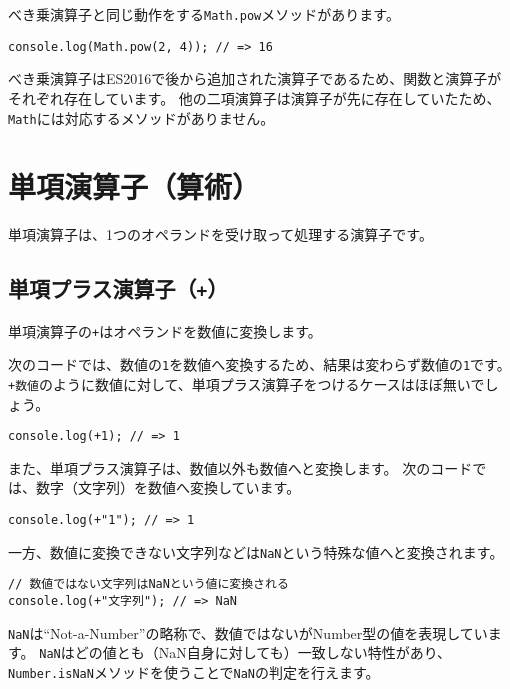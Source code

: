 べき乗演算子と同じ動作をする\texttt{Math.pow}メソッドがあります。

\begin{lstlisting}
console.log(Math.pow(2, 4)); // => 16
\end{lstlisting}

べき乗演算子はES2016で後から追加された演算子であるため、関数と演算子がそれぞれ存在しています。
他の二項演算子は演算子が先に存在していたため、\texttt{Math}には対応するメソッドがありません。

\hypertarget{unary-operator}{%
\section{単項演算子（算術）}\label{unary-operator}}

単項演算子は、1つのオペランドを受け取って処理する演算子です。

\hypertarget{unary-plus-operator}{%
\subsection{\texorpdfstring{単項プラス演算子（\texttt{+}）}{単項プラス演算子（+）}}\label{unary-plus-operator}}

単項演算子の\texttt{+}はオペランドを数値に変換します。

次のコードでは、数値の\texttt{1}を数値へ変換するため、結果は変わらず数値の\texttt{1}です。
\texttt{+数値}のように数値に対して、単項プラス演算子をつけるケースはほぼ無いでしょう。

\begin{lstlisting}
console.log(+1); // => 1
\end{lstlisting}

また、単項プラス演算子は、数値以外も数値へと変換します。
次のコードでは、数字（文字列）を数値へ変換しています。

\begin{lstlisting}
console.log(+"1"); // => 1
\end{lstlisting}

一方、数値に変換できない文字列などは\texttt{NaN}という特殊な値へと変換されます。

\begin{lstlisting}
// 数値ではない文字列はNaNという値に変換される
console.log(+"文字列"); // => NaN
\end{lstlisting}

\texttt{NaN}は``Not-a-Number''の略称で、数値ではないがNumber型の値を表現しています。
\texttt{NaN}はどの値とも（NaN自身に対しても）一致しない特性があり、\texttt{Number.isNaN}メソッドを使うことで\texttt{NaN}の判定を行えます。

